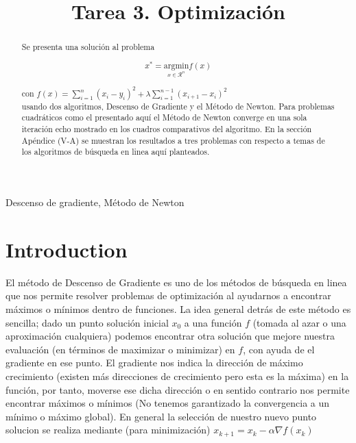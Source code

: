 \documentclass[conference]{IEEEtran}
\begin{document}
\title{Tarea 3. Optimización }

\author{
}

\maketitle

\begin{abstract}
Se presenta una solución al problema

$$x^* = \underset{x \in \mathcal{R}^n}{\mathrm{argmin}} f(x)$$

con
$f(x) = \sum_{i=1}^{n} (x_i-y_i)^2 + \lambda \sum_{i=1}^{n-1} (x_{i+1} - x_i)^2$\\

usando dos algoritmos, Descenso de Gradiente y el Método de Newton. Para
problemas cuadráticos como el presentado aquí el Método de Newton converge
en una sola iteración echo mostrado en los cuadros comparativos del algoritmo.
En la sección Apéndice (V-A) se muestran los resultados a tres problemas con respecto
a temas de los algoritmos de búsqueda en linea aquí planteados.

\end{abstract}

\begin{IEEEkeywords}
Descenso de gradiente, Método de Newton
\end{IEEEkeywords}

\section{Introduction}

El método de Descenso de Gradiente es uno de los métodos de búsqueda en linea que
nos permite resolver problemas de optimización al ayudarnos a encontrar máximos
o mínimos dentro de funciones. La idea general detrás de este método es sencilla;
dado un punto solución inicial $x_0$ a una función $f$ (tomada al azar o una aproximación cualquiera) podemos
encontrar otra solución que mejore nuestra evaluación (en términos de maximizar
o minimizar) en $f$, con ayuda de el gradiente en ese punto. El gradiente nos
indica la dirección de máximo crecimiento (existen más direcciones de crecimiento
pero esta es la máxima) en la función, por tanto, moverse ese dicha dirección o
en sentido contrario nos permite encontrar máximos o mínimos (No tenemos
garantizado la convergencia a un mínimo o máximo global). En general la selección
de nuestro nuevo punto solucion se realiza mediante (para minimización)
$x_{k+1} = x_k - \alpha \nabla f(x_k)$\\
\end{document}
